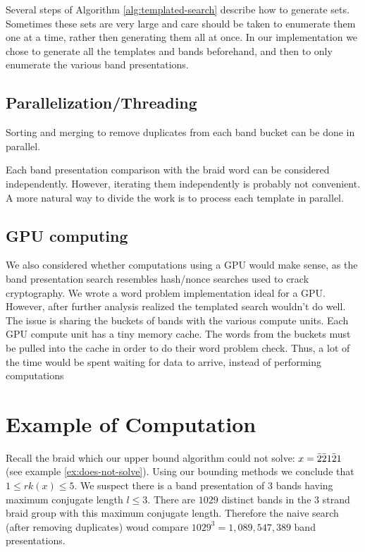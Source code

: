 \documentclass[12pt]{thesis}
\begin{document}
Several steps of Algorithm \ref{alg:templated-search} describe how to generate sets. 
Sometimes these sets are very large and care should be
taken to enumerate them one at a time, rather then generating them all at once.
In our implementation we chose to 
generate all the templates and bands beforehand,
and then to only enumerate the various band presentations.

\subsection{Parallelization/Threading}

Sorting and merging to remove duplicates from each band
bucket can be done in parallel.

Each band presentation comparison with the braid word
can be considered independently.
However, iterating them independently is probably not convenient.
A more natural way to divide the work is to process
each template in parallel.

\subsection{GPU computing}

We also considered whether computations using a GPU would make sense,
as the band presentation search resembles hash/nonce searches used to crack cryptography.
We wrote a word problem implementation ideal for a GPU.
However, after further analysis realized the templated search wouldn't do well. 
The issue is sharing the buckets of bands with the various compute units.
Each GPU compute unit has a tiny memory cache.
The words from the buckets must be pulled into the cache in order to do their word problem check.
Thus, a lot of the time would be spent waiting for data to arrive, instead of 
performing computations

\section{Example of Computation}

Recall the braid which our upper bound algorithm
could not solve: $x = \bar{2} \bar{2} 1 \bar{2} 1$ (see example \ref{ex:does-not-solve}).
Using our bounding methods we conclude that $1 \leq rk(x) \leq 5$.
We suspect there is a band presentation of $3$ bands having maximum conjugate length $l \leq 3$.
There are $1029$  distinct bands in the $3$ strand braid group with this maximum conjugate length.
Therefore the naive search (after removing duplicates)
woud compare $1029^{3} = 1,089,547,389$ band presentations.
\end{document}
